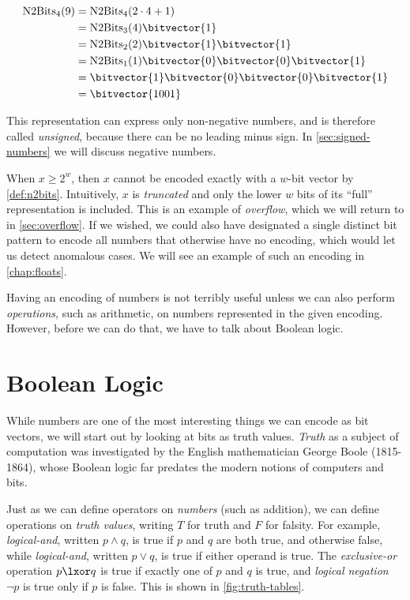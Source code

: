   \begin{example}
\begin{align}
  \mathrm{N2Bits}_{4}(9) &= \mathrm{N2Bits}_{4}(2\cdot{}4 + 1) \\
            &= \mathrm{N2Bits}_{3}(4) \bitvector{1} \\
            &= \mathrm{N2Bits}_{2}(2) \bitvector{1} \bitvector{1} \\
            &= \mathrm{N2Bits}_{1}(1) \bitvector{0} \bitvector{0} \bitvector{1} \\
            &= \bitvector{1} \bitvector{0} \bitvector{0} \bitvector{1} \\
            &= \bitvector{1001}
\end{align}
  \end{example}

This representation can express only non-negative numbers, and is
therefore called \emph{unsigned}, because there can be no leading
minus sign. In \cref{sec:signed-numbers} we will discuss negative
numbers.

When $x \geq 2^{w}$, then $x$ cannot be encoded exactly with a $w$-bit
vector by \cref{def:n2bits}. Intuitively, $x$ is \emph{truncated} and
only the lower $w$ bits of its ``full'' representation is included.
This is an example of \emph{overflow}, which we will return to in
\cref{sec:overflow}. If we wished, we could also have designated a
single distinct bit pattern to encode all numbers that otherwise have
no encoding, which would let us detect anomalous cases. We will see an
example of such an encoding in \cref{chap:floats}.

Having an encoding of numbers is not terribly useful unless we can
also perform \emph{operations}, such as arithmetic, on numbers
represented in the given encoding.  However, before we can do that,
we have to talk about Boolean logic.

\section{Boolean Logic}
\label{sec:boolean-logic}

While numbers are one of the most interesting things we can encode as
bit vectors, we will start out by looking at bits as truth values.
\emph{Truth} as a subject of computation was investigated by the
English mathematician George Boole (1815-1864), whose Boolean logic
far predates the modern notions of computers and bits.

Just as we can define operators on \emph{numbers} (such as addition),
we can define operations on \emph{truth values}, writing $T$ for truth
and $F$ for falsity.  For example, \emph{logical-and}, written
$p \land q$, is true if $p$ and $q$ are both true, and otherwise
false, while \emph{logical-and}, written $p \lor q$, is true if either
operand is true.  The \emph{exclusive-or} operation $p \lxor q$ is
true if exactly one of $p$ and $q$ is true, and \emph{logical
  negation} $\neg p$ is true only if $p$ is false.  This is shown in
\cref{fig:truth-tables}.

